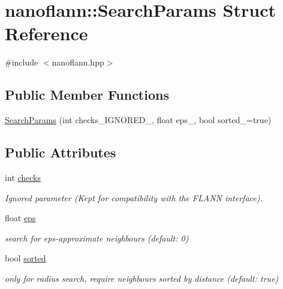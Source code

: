 \hypertarget{structnanoflann_1_1_search_params}{\section{nanoflann\-:\-:Search\-Params Struct Reference}
\label{structnanoflann_1_1_search_params}
}


{\ttfamily \#include $<$nanoflann.\-hpp$>$}

\subsection*{Public Member Functions}
\begin{DoxyCompactItemize}
\item 
\hyperlink{structnanoflann_1_1_search_params_a6403dc9f294491da3f68b243f9f2cee8}{Search\-Params} (int checks\-\_\-\-I\-G\-N\-O\-R\-E\-D\-\_, float eps\-\_, bool sorted\-\_\-=true)
\end{DoxyCompactItemize}
\subsection*{Public Attributes}
\begin{DoxyCompactItemize}
\item 
int \hyperlink{structnanoflann_1_1_search_params_a904f56b474fb6ff0aaa632e9329d9dda}{checks}
\begin{DoxyCompactList}\small\item\em Ignored parameter (Kept for compatibility with the F\-L\-A\-N\-N interface). \end{DoxyCompactList}\item 
float \hyperlink{structnanoflann_1_1_search_params_a64b9e7c56bbb743694f6188f616a94cc}{eps}
\begin{DoxyCompactList}\small\item\em search for eps-\/approximate neighbours (default\-: 0) \end{DoxyCompactList}\item 
bool \hyperlink{structnanoflann_1_1_search_params_a5126d5f71f1c9163c6a581776a0e9466}{sorted}
\begin{DoxyCompactList}\small\item\em only for radius search, require neighbours sorted by distance (default\-: true) \end{DoxyCompactList}\end{DoxyCompactItemize}


